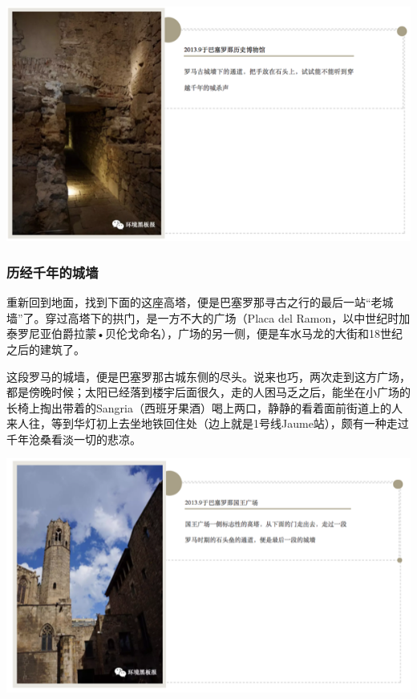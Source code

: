 \documentclass[]{book}
\begin{document}
\includegraphics[width=8.33in]{images/xt18}

\hypertarget{ux5386ux7ecfux5343ux5e74ux7684ux57ceux5899}{%
\subsubsection{历经千年的城墙}\label{ux5386ux7ecfux5343ux5e74ux7684ux57ceux5899}}

重新回到地面，找到下面的这座高塔，便是巴塞罗那寻古之行的最后一站``老城墙''了。穿过高塔下的拱门，是一方不大的广场（Placa del Ramon，以中世纪时加泰罗尼亚伯爵拉蒙•贝伦戈命名），广场的另一侧，便是车水马龙的大街和18世纪之后的建筑了。

这段罗马的城墙，便是巴塞罗那古城东侧的尽头。说来也巧，两次走到这方广场，都是傍晚时候；太阳已经落到楼宇后面很久，走的人困马乏之后，能坐在小广场的长椅上掏出带着的Sangria（西班牙果酒）喝上两口，静静的看着面前街道上的人来人往，等到华灯初上去坐地铁回住处（边上就是1号线Jaume站），颇有一种走过千年沧桑看淡一切的悲凉。

\includegraphics[width=8.33in]{images/xt19}
\end{document}

